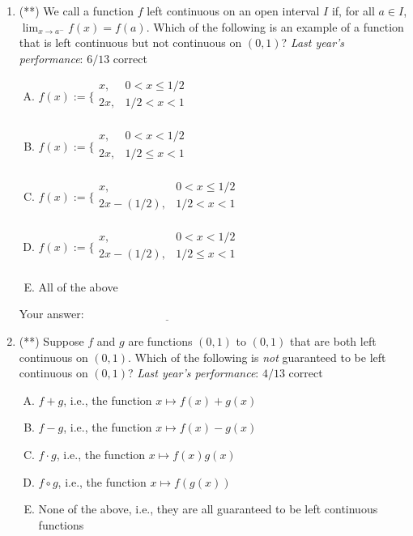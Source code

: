 \documentclass[10pt]{amsart}
\begin{document}
\begin{enumerate}

\item (**) We call a function $f$ left continuous on an open interval $I$
  if, for all $a \in I$, $\lim_{x \to a^-} f(x) = f(a)$. Which of the
  following is an example of a function that is left continuous but
  not continuous on $(0,1)$? {\em Last year's performance}: $6/13$ correct

  \begin{enumerate}[(A)]
  \item $f(x) := \lbrace\begin{array}{rl}x, & 0 < x \le 1/2 \\ 2x, & 1/2 < x < 1 \\\end{array}$
  \item $f(x) := \lbrace\begin{array}{rl}x, & 0 < x < 1/2 \\ 2x, & 1/2 \le x < 1 \\\end{array}$
  \item $f(x) := \lbrace\begin{array}{rl}x, & 0 < x \le 1/2 \\ 2x - (1/2), & 1/2 < x < 1 \\\end{array}$
  \item $f(x) := \lbrace\begin{array}{rl}x, & 0 < x < 1/2 \\ 2x - (1/2), & 1/2 \le x < 1 \\\end{array}$
  \item All of the above
  \end{enumerate}

  \vspace{0.1in}
  Your answer: $\underline{\qquad\qquad\qquad\qquad\qquad\qquad\qquad}$
  \vspace{1.5in}
  
\item (**) Suppose $f$ and $g$ are functions $(0,1)$ to $(0,1)$ that
  are both left continuous on $(0,1)$. Which of the following is {\em
    not} guaranteed to be left continuous on $(0,1)$? {\em Last year's
    performance}: $4/13$ correct

  \begin{enumerate}[(A)]
  \item $f + g$, i.e., the function $x \mapsto f(x) + g(x)$
  \item $f - g$, i.e., the function $x \mapsto f(x) - g(x)$
  \item $f \cdot g$, i.e., the function $x \mapsto f(x)g(x)$
  \item $f \circ g$, i.e., the function $x \mapsto f(g(x))$
  \item None of the above, i.e., they are all guaranteed to be left
  continuous functions
  \end{enumerate}


\end{enumerate}
\end{document}
